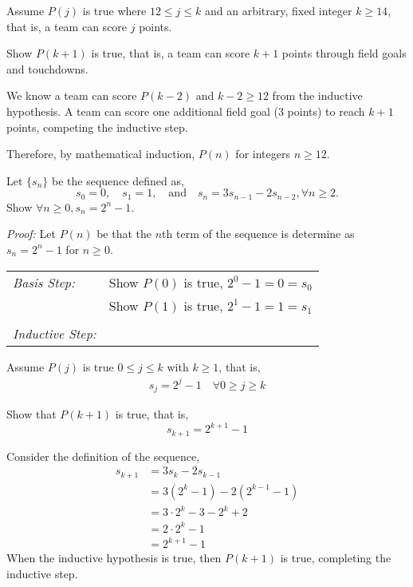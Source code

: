 \begin{questions}
\begin{solution}
    Assume $P(j)$ is true where $12 \leq j \leq k$ and an arbitrary, fixed integer $k \geq 14$, that is, a team can score $j$ points. 

    Show $P(k+1)$ is true, that is, a team can score $k+1$ points through field goals and touchdowns.

    We know a team can score $P(k-2)$ and $k -2 \geq 12$ from the inductive hypothesis. A team can score one additional field goal (3 points) to reach $k+1$ points, competing the inductive step. 

    Therefore, by mathematical induction, $P(n)$ for integers $n \geq 12$. 
\end{solution}


 Let $\{s_n\}$ be the sequence defined as, 
\[ s_0 = 0, \quad s_1 = 1,  \quad \text{and} \quad s_n = 3s_{n-1} - 2s_{n-2}, \forall n \geq 2. \]
Show $\forall n \geq 0, s_n = 2^n - 1 .$
    \ifprintanswers
        \vspace{-10pt}
   \fi
\begin{solution}
  \textit{Proof:}
  Let $P(n)$ be that the $n$th term of the sequence is determine as $s_n = 2^n - 1$ for $n \geq 0$.

  \smallskip
  \begin{tabular}{lp{4in}}
    \textit{Basis Step:}  & Show $P(0)$ is true, $2^0 - 1 = 0 = s_0$ \\
                & Show $P(1)$ is true, $2^1 - 1 = 1 = s_1$ \\
     & \\
   \textit{Inductive Step:} &  \\
  \end{tabular}

  Assume $P(j)$ is true $0 \leq j \leq k$ with $k \geq 1$, that is, 
  \begin{align*}
    s_j = 2^j - 1 \quad \forall 0 \geq j \geq k \tag{IH}
  \end{align*}

  Show that $P(k+1)$ is true, that is,
  \[ s_{k+1} = 2^{k+1} - 1 \] 

  Consider the definition of the sequence, 
  \begin{align*}
    s_{k+1} &= 3s_{k} - 2s_{k-1} \\
    &= 3(2^k - 1) - 2(2^{k-1} - 1) \\
    &= 3\cdot 2^k - 3 - 2^k + 2 \\
    &= 2\cdot 2^k - 1 \\
    &= 2^{k+1} - 1
  \end{align*}
  When the inductive hypothesis is true, then $P(k+1)$ is true, completing the inductive step. 


\end{solution}
\end{questions}
